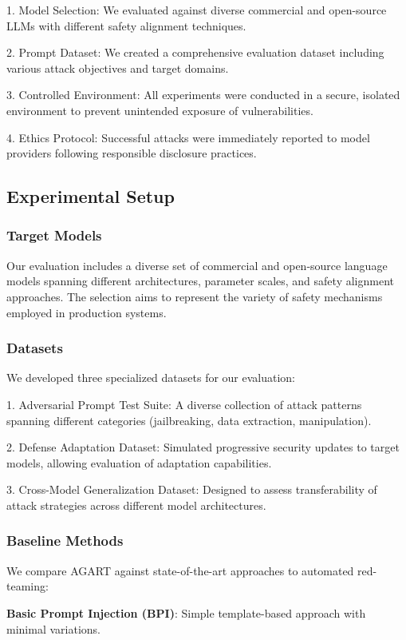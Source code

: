 1. Model Selection: We evaluated against diverse commercial and open-source LLMs with different safety alignment techniques.

2. Prompt Dataset: We created a comprehensive evaluation dataset including various attack objectives and target domains.

3. Controlled Environment: All experiments were conducted in a secure, isolated environment to prevent unintended exposure of vulnerabilities.

4. Ethics Protocol: Successful attacks were immediately reported to model providers following responsible disclosure practices.

\subsection{Experimental Setup}

\subsubsection{Target Models}
Our evaluation includes a diverse set of commercial and open-source language models spanning different architectures, parameter scales, and safety alignment approaches. The selection aims to represent the variety of safety mechanisms employed in production systems.

\subsubsection{Datasets}
We developed three specialized datasets for our evaluation:

1. Adversarial Prompt Test Suite: A diverse collection of attack patterns spanning different categories (jailbreaking, data extraction, manipulation).

2. Defense Adaptation Dataset: Simulated progressive security updates to target models, allowing evaluation of adaptation capabilities.

3. Cross-Model Generalization Dataset: Designed to assess transferability of attack strategies across different model architectures.

\subsubsection{Baseline Methods}
We compare AGART against state-of-the-art approaches to automated red-teaming:

\textbf{Basic Prompt Injection (BPI)}: Simple template-based approach with minimal variations.

